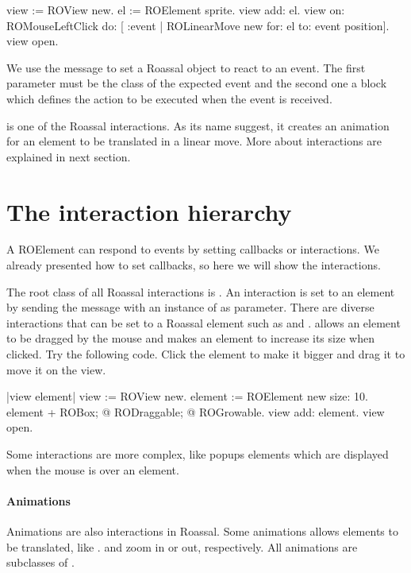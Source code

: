 \documentclass[a4paper,10pt,twoside]{book}
\begin{document}
\begin{code}{}
view := ROView new.
el := ROElement sprite.
view add: el.
view 
	on: ROMouseLeftClick 
	do: [ :event | 
	        ROLinearMove new	for: el to: event position].
view open. 
\end{code}

We use the  message to set a Roassal object to react to an event. The first parameter must be the class of the expected event and the second one a block which defines the action to be executed when the event is received.

 is one of the Roassal interactions. As its name suggest, it creates an animation for an element to be translated in a linear move. More about interactions are explained in next section.

%


\section{The interaction hierarchy} 

A ROElement can respond to events by setting callbacks or interactions. We already presented how to set callbacks, so here we will show the interactions. 

The root class of all Roassal interactions is . An interaction is set to an element by sending the  message with an instance of  as parameter. There are diverse interactions that can be set to a Roassal element such as    and .
 allows an element to be dragged by the mouse and  makes an element to increase its size when clicked. Try the following code. Click the element to make it bigger and drag it to move it on the view.

\begin{code}{}
|view element|
view := ROView new.
element := ROElement new size: 10.
element 
	+ ROBox;
	@ RODraggable; 
	@ ROGrowable.
view add: element.
view open.
\end{code}


Some interactions are more complex, like popups elements which are displayed when the mouse is over an element. 

\paragraph{Animations} Animations are also interactions in Roassal. Some animations allows elements to be translated, like .  and  zoom in or out, respectively. All animations are subclasses of .
\end{document}
